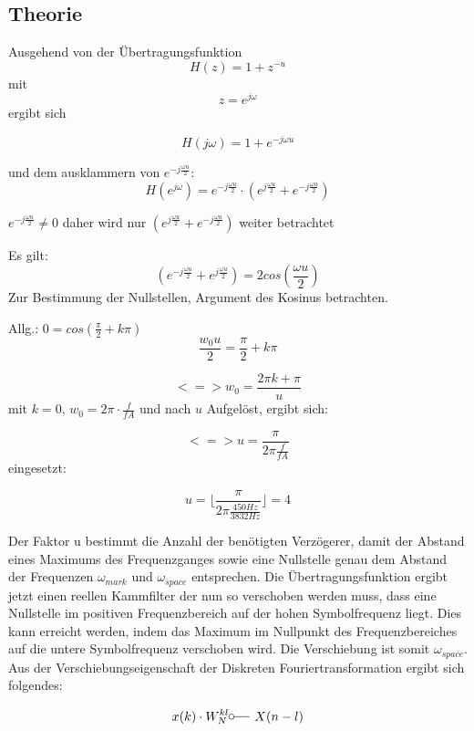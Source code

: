 \documentclass{article}
\begin{document}
\subsection{Theorie}


Ausgehend von der Übertragungsfunktion 
$$H(z) = 1 + z^{-u}$$ 
mit 
$$ z = e^{j\omega} $$
ergibt sich

$$H(j\omega) = 1 + e^{-j\omega u}$$

und dem ausklammern von $ e^{-j \frac{\omega u}{2}}$:
$$
H(e^{j\omega}) = e^{-j \frac{\omega u}{2}} \cdot (e^{j \frac{\omega u}{2}} + e^{-j \frac{\omega u}{2}})
$$

$e^{-j \frac{\omega u}{2}} \neq 0$ daher wird nur $(e^{j \frac{\omega u}{2}} + e^{-j \frac{\omega u}{2}})$ weiter betrachtet

Es gilt:
$$
(e^{-j \frac{\omega u}{2}} + e^{j \frac{\omega u}{2}}) = 2  cos(\frac{\omega u}{2})
$$
Zur Bestimmung der Nullstellen, Argument des Kosinus betrachten.

Allg.: $0 = cos(\frac{\pi}{2} + k\pi)$
$$
\frac{w_0 u}{2} = \frac{\pi}{2} + k\pi
$$

$$
<=> w_0 = \frac{2\pi k + \pi}{u}
$$
mit $k = 0$, $w_0 = 2\pi \cdot \frac{f}{fA}$ und nach $u$ Aufgelöst, ergibt sich:

$$
<=> u = \frac{\pi}{2\pi \frac{f}{fA}}
$$
eingesetzt:

$$
u = \lfloor \frac{\pi}{2\pi \frac{450Hz}{3832Hz}}\rfloor = 4
$$

Der Faktor u bestimmt die Anzahl der benötigten Verzögerer, damit der Abstand eines Maximums des Frequenzganges sowie eine Nullstelle genau dem Abstand der Frequenzen $\omega_{mark}$ und $\omega_{space}$ entsprechen. Die Übertragungsfunktion ergibt jetzt einen reellen Kammfilter der nun so verschoben werden muss, dass eine Nullstelle im positiven Frequenzbereich auf der hohen Symbolfrequenz liegt. Dies kann erreicht werden, indem das Maximum im Nullpunkt des Frequenzbereiches auf die untere Symbolfrequenz verschoben wird. Die Verschiebung ist somit $\omega_{space}$.
Aus der Verschiebungseigenschaft der Diskreten Fouriertransformation ergibt sich folgendes:
 
$$
x(k) \cdot W^{kl}_N \fourier X(n-l)
$$
\end{document}
